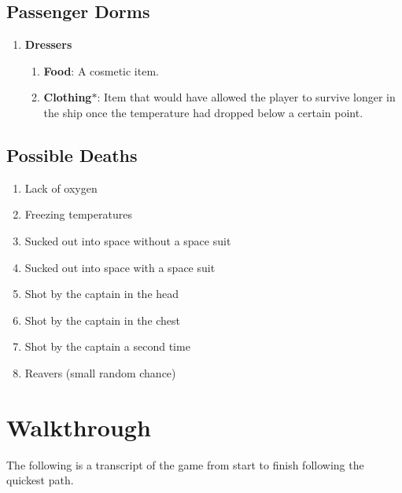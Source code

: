 \documentclass[12pt]{article}
\begin{document}


\subsection{Passenger Dorms}

\begin{enumerate}
  \item \textbf{Dressers}
  \begin{enumerate}
    \item \textbf{Food}: A cosmetic item.
    \item \textbf{Clothing}$\ast$: Item that would have allowed the player to survive
    longer in the ship once the temperature had dropped below a certain point. 
  \end{enumerate}
\end{enumerate}



\subsection{Possible Deaths}

\begin{enumerate}
  \item Lack of oxygen
  \item Freezing temperatures
  \item Sucked out into space without a space suit
  \item Sucked out into space with a space suit
  \item Shot by the captain in the head
  \item Shot by the captain in the chest
  \item Shot by the captain a second time
  \item Reavers (small random chance)
\end{enumerate}



\section{Walkthrough}

\qq The following is a transcript of the game from start to finish following the
quickest path.



\end{document}
